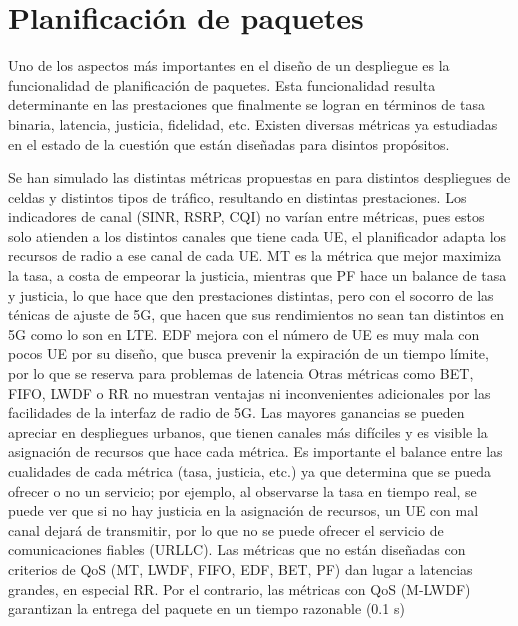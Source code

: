 \documentclass[12pt]{report} %
\begin{document}
\section{Planificación de paquetes}

Uno de los aspectos más importantes en el diseño de un despliegue es la funcionalidad de planificación de paquetes.
Esta funcionalidad resulta determinante en las prestaciones que finalmente se logran en términos de tasa binaria, latencia, justicia, fidelidad, etc.
Existen diversas métricas ya estudiadas en el estado de la cuestión que están diseñadas para disintos propósitos.
\cite{RefWorks:26}

Se han simulado las distintas métricas propuestas en \cite{RefWorks:26} para distintos despliegues de celdas y distintos tipos de tráfico, resultando en distintas prestaciones.
Los indicadores de canal (SINR, RSRP, CQI) no varían entre métricas, pues estos solo atienden a los distintos canales que tiene cada UE,
el planificador adapta los recursos de radio a ese canal de cada UE.
MT es la métrica que mejor maximiza la tasa, a costa de empeorar la justicia,
mientras que PF hace un balance de tasa y justicia,
lo que hace que den prestaciones distintas, pero con el socorro de las ténicas de ajuste de 5G,
que hacen que sus rendimientos no sean tan distintos en 5G como lo son en LTE.
EDF mejora con el número de UE es muy mala con pocos UE por su diseño, que busca prevenir la expiración de un tiempo límite,
por lo que se reserva para problemas de latencia
Otras métricas como BET, FIFO, LWDF o RR no muestran ventajas ni inconvenientes adicionales por las facilidades de la interfaz de radio de 5G.
Las mayores ganancias se pueden apreciar en despliegues urbanos, que tienen canales más difíciles y es visible la asignación de recursos que hace cada métrica.
Es importante el balance entre las cualidades de cada métrica (tasa, justicia, etc.) ya que determina que se pueda ofrecer o no un servicio;
por ejemplo, al observarse la tasa en tiempo real, se puede ver que si no hay justicia en la asignación de recursos, un UE con mal canal dejará de transmitir, por lo que no se puede ofrecer el servicio de comunicaciones fiables (URLLC).
Las métricas que no están diseñadas con criterios de QoS (MT, LWDF, FIFO, EDF, BET, PF) dan lugar a latencias grandes, en especial RR.
Por el contrario, las métricas con QoS (M-LWDF) garantizan la entrega del paquete en un tiempo
razonable (0.1 s)
\end{document}
